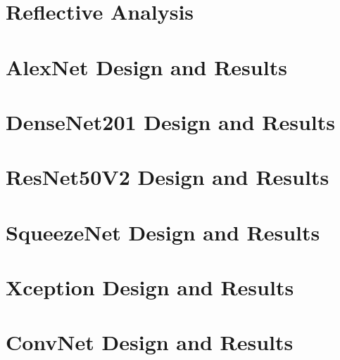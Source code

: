 \documentclass[harvard]{lincolncsthesis}
\begin{document}
\chapter{Reflective Analysis}




\printReferences


\appendix
\chapter{AlexNet Design and Results}

\chapter{DenseNet201 Design and Results}

\chapter{ResNet50V2 Design and Results}

\chapter{SqueezeNet Design and Results}

\chapter{Xception Design and Results}

\chapter{ConvNet Design and Results}

\end{document}
